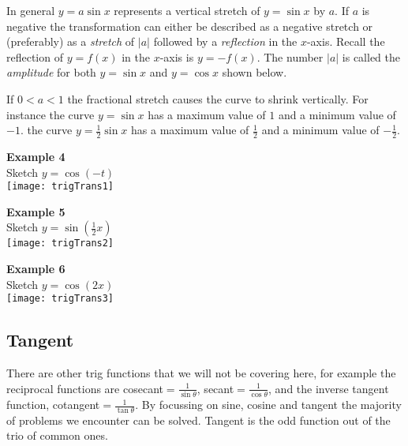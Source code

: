 In general $y =a \sin  x$ represents a vertical stretch of $y =\sin  x$ by $a$. If $a$ is negative the transformation can either be described as a negative stretch or (preferably) as a \emph{stretch}
of $\left \vert a\right \vert $ followed by a \emph{reflection} in the $x$-axis. Recall the reflection of $y =f \left (x\right )$ in the $x$-axis is $y = -f \left (x\right )$. The number $\left \vert a\right \vert $ is called the \emph{amplitude} for both $y =\sin  x$ and $y =\cos  x$ shown below. 

If $0 <a <1$ the fractional stretch causes the curve to shrink vertically. For instance the curve
$y =\sin  x$ has a maximum value of $1$ and a minimum value of $ -1$. the curve $y =\frac{1}{2} \sin  x$ has a maximum value of $\frac{1}{2}$ and a minimum value of $ -\frac{1}{2}$. 
\columnsep=10pt
\begin{multicols}{3}
\textbf{Example 4} \\Sketch $y =\cos  ( -t)$\\ 
\texttt{[image: trigTrans1]}

\columnbreak

\textbf{Example 5} \\Sketch $y =\sin \left( \frac{1}{2}x\right)$\\
\texttt{[image: trigTrans2]}
\columnbreak

\textbf{Example 6} \\Sketch $y =\cos(2x)$\\
\texttt{[image: trigTrans3]}
\end{multicols}

\subsection*{Tangent}
 There are other trig functions that we will not be covering here, for example the reciprocal functions are cosecant$=\frac{1}{\sin\theta}$, secant$=\frac{1}{\cos\theta}$, and the inverse tangent function, cotangent$=\frac{1}{\tan\theta}$. By focussing on sine, cosine and tangent the majority of problems we encounter can be solved. Tangent is the odd function out of the trio of common ones.

